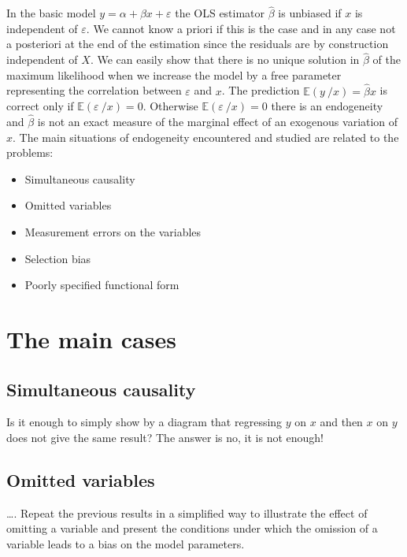 \documentclass[
]{report}
\providecommand{\tightlist}{%
  \setlength{\itemsep}{0pt}\setlength{\parskip}{0pt}}
\begin{document}
In the basic model \(y=\alpha+\beta x+\varepsilon\) the OLS estimator \(\hat{\beta}\) is unbiased if \(x\) is independent of \(\varepsilon\). We cannot know a priori if this is the case and in any case not a posteriori at the end of the estimation since the residuals are by construction independent of \(X\). We can easily show that there is no unique solution in \(\hat{\beta}\) of the maximum likelihood when we increase the model by a free parameter representing the correlation between \(\varepsilon\) and \(x\).
The prediction \(\mathbb{E}(y~/x)=\hat{\beta}x\) is correct only if \(\mathbb{E}(\varepsilon~/x)=0\).
Otherwise \(\mathbb{E}(\varepsilon~/x)=0\) there is an endogeneity and \(\hat{\beta}\) is not an exact measure of the marginal effect of an exogenous variation of \(x\).
The main situations of endogeneity encountered and studied are related to the problems:

\begin{itemize}
\tightlist
\item
  Simultaneous causality
\item
  Omitted variables
\item
  Measurement errors on the variables
\item
  Selection bias
\item
  Poorly specified functional form
\end{itemize}

\hypertarget{the-main-cases}{%
\section{The main cases}\label{the-main-cases}}

\hypertarget{simultaneous-causality}{%
\subsection{Simultaneous causality}\label{simultaneous-causality}}

Is it enough to simply show by a diagram that regressing \(y\) on \(x\) and then \(x\) on \(y\) does not give the same result?
The answer is no, it is not enough!

\hypertarget{omitted-variables}{%
\subsection{Omitted variables}\label{omitted-variables}}

\ldots. Repeat the previous results in a simplified way to illustrate the effect of omitting a variable and present the conditions under which the omission of a variable leads to a bias on the model parameters.
\end{document}
